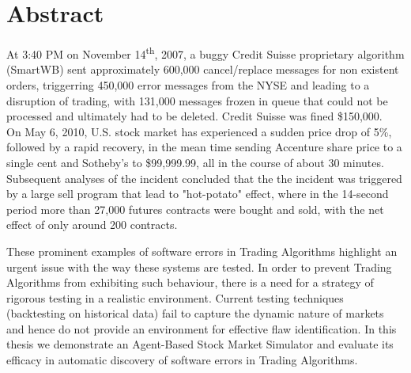 \chapter*{Abstract}
At 3:40 PM on November 14\textsuperscript{th}, 2007, a buggy Credit Suisse proprietary algorithm (SmartWB) sent approximately 600,000 cancel/replace messages for non existent orders, triggerring 450,000 error messages from the NYSE and leading to a disruption of trading, with 131,000 messages frozen in queue that could not be processed and ultimately had to be deleted. Credit Suisse was fined \$150,000.~\cite{Nyse2009} On May 6, 2010, U.S. stock market has experienced a sudden price drop of 5\%, followed by a rapid recovery, in the mean time sending Accenture share price to a single cent and Sotheby’s to \$99,999.99, all in the course of about 30 minutes. Subsequent analyses of the incident concluded that the the incident was triggered by a large sell program that lead to "hot-potato" effect, where in the 14-second period more than 27,000 futures contracts were bought and sold, with the net effect of only around 200 contracts.~\cite{Kirilenko2011}

These prominent examples of software errors in Trading Algorithms highlight an urgent issue with the way these systems are tested. In order to prevent Trading Algorithms from exhibiting such behaviour, there is a need for a strategy of rigorous testing in a realistic environment. Current testing techniques (backtesting on historical data) fail to capture the dynamic nature of markets and hence do not provide an environment for effective flaw identification. In this thesis we demonstrate an Agent-Based Stock Market Simulator and evaluate its efficacy in automatic discovery of software errors in Trading Algorithms.
\vfill